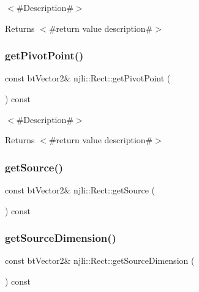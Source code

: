 $<$\#\+Description\#$>$

\begin{DoxyReturn}{Returns}
$<$\#return value description\#$>$ 
\end{DoxyReturn}
\mbox{\label{classnjli_1_1_rect_a6d7b7208975391879326a1d0c957a30b}} 
\subsubsection{\texorpdfstring{get\+Pivot\+Point()}{getPivotPoint()}}
{\footnotesize\ttfamily const bt\+Vector2\& njli\+::\+Rect\+::get\+Pivot\+Point (\begin{DoxyParamCaption}{ }\end{DoxyParamCaption}) const}

$<$\#\+Description\#$>$

\begin{DoxyReturn}{Returns}
$<$\#return value description\#$>$ 
\end{DoxyReturn}
\mbox{\label{classnjli_1_1_rect_aa68763bfa980409c25d162f10281cc12}} 
\subsubsection{\texorpdfstring{get\+Source()}{getSource()}}
{\footnotesize\ttfamily const bt\+Vector2\& njli\+::\+Rect\+::get\+Source (\begin{DoxyParamCaption}{ }\end{DoxyParamCaption}) const}

\mbox{\label{classnjli_1_1_rect_abdc3ffdb2db699465f774dba88dced61}} 
\subsubsection{\texorpdfstring{get\+Source\+Dimension()}{getSourceDimension()}}
{\footnotesize\ttfamily const bt\+Vector2\& njli\+::\+Rect\+::get\+Source\+Dimension (\begin{DoxyParamCaption}{ }\end{DoxyParamCaption}) const}


